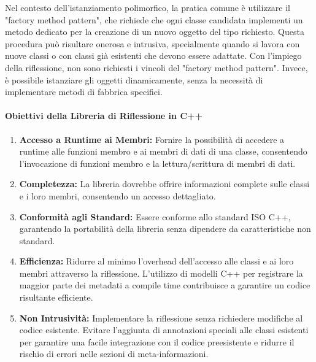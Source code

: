 \documentclass[11pt]{article}
\begin{document}
\begin{multicols*}{2}[\columnsep=1cm]
\begin{itemize}
    Nel contesto dell'istanziamento polimorfico, la pratica comune è utilizzare il "factory method pattern", che richiede che ogni classe candidata implementi un metodo dedicato per la creazione di un nuovo oggetto del tipo richiesto. Questa procedura può risultare onerosa e intrusiva, specialmente quando si lavora con nuove classi o con classi già esistenti che devono essere adattate.
    Con l'impiego della riflessione, non sono richiesti i vincoli del "factory method pattern". Invece, è possibile istanziare gli oggetti dinamicamente, senza la necessità di implementare metodi di fabbrica specifici.
    \end{itemize}
    \paragraph{Obiettivi della Libreria di Riflessione in C++}

    \begin{enumerate}
        \item \textbf{Accesso a Runtime ai Membri:} Fornire la possibilità di accedere a runtime alle funzioni membro e ai membri di dati di una classe, consentendo l'invocazione di funzioni membro e la lettura/scrittura di membri di dati.
    
        \item \textbf{Completezza:} La libreria dovrebbe offrire informazioni complete sulle classi e i loro membri, consentendo un accesso dettagliato.
    
        \item \textbf{Conformità agli Standard:} Essere conforme allo standard ISO C++, garantendo la portabilità della libreria senza dipendere da caratteristiche non standard.
    
        \item \textbf{Efficienza:} Ridurre al minimo l'overhead dell'accesso alle classi e ai loro membri attraverso la riflessione. L'utilizzo di modelli C++ per registrare la maggior parte dei metadati a compile time contribuisce a garantire un codice risultante efficiente.
    
        \item \textbf{Non Intrusività:} Implementare la riflessione senza richiedere modifiche al codice esistente. Evitare l'aggiunta di annotazioni speciali alle classi esistenti per garantire una facile integrazione con il codice preesistente e ridurre il rischio di errori nelle sezioni di meta-informazioni.
    \end{enumerate}


\end{multicols*}
\end{document}
